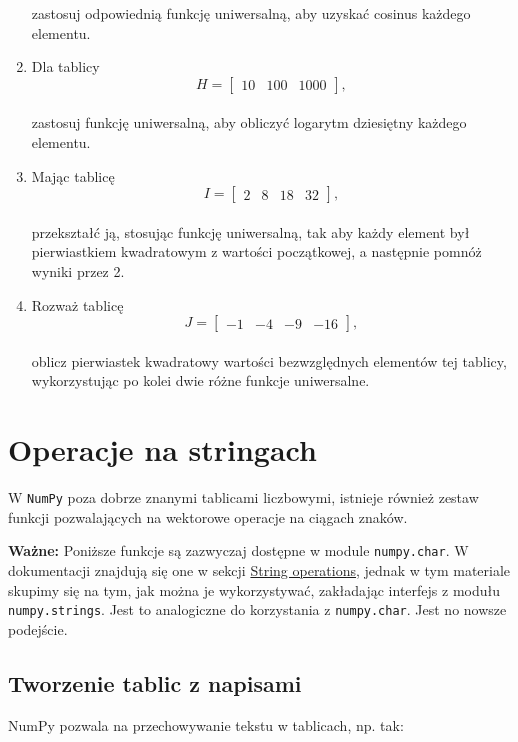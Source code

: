 \documentclass[
  letterpaper,
  DIV=11,
  numbers=noendperiod]{scrreprt}
\begin{document}
\begin{enumerate}
  zastosuj odpowiednią funkcję uniwersalną, aby uzyskać cosinus każdego
  elementu.
\item
  Dla tablicy\\
  \[H = \begin{bmatrix}10 & 100 & 1000\end{bmatrix},\]\\
  zastosuj funkcję uniwersalną, aby obliczyć logarytm dziesiętny każdego
  elementu.
\item
  Mając tablicę\\
  \[I = \begin{bmatrix}2 & 8 & 18 & 32\end{bmatrix},\]\\
  przekształć ją, stosując funkcję uniwersalną, tak aby każdy element
  był pierwiastkiem kwadratowym z wartości początkowej, a następnie
  pomnóż wyniki przez 2.
\item
  Rozważ tablicę\\
  \[J = \begin{bmatrix}-1 & -4 & -9 & -16\end{bmatrix},\]\\
  oblicz pierwiastek kwadratowy wartości bezwzględnych elementów tej
  tablicy, wykorzystując po kolei dwie różne funkcje uniwersalne.
\end{enumerate}

\chapter{Operacje na stringach}\label{operacje-na-stringach}

W \texttt{NumPy} poza dobrze znanymi tablicami liczbowymi, istnieje
również zestaw funkcji pozwalających na wektorowe operacje na ciągach
znaków.

\textbf{Ważne:} Poniższe funkcje są zazwyczaj dostępne w module
\texttt{numpy.char}. W dokumentacji znajdują się one w sekcji
\href{https://numpy.org/doc/stable/reference/routines.strings.html}{String
operations}, jednak w tym materiale skupimy się na tym, jak można je
wykorzystywać, zakładając interfejs z modułu \texttt{numpy.strings}.
Jest to analogiczne do korzystania z \texttt{numpy.char}. Jest no nowsze
podejście.

\section{Tworzenie tablic z napisami}\label{tworzenie-tablic-z-napisami}

NumPy pozwala na przechowywanie tekstu w tablicach, np. tak:
\end{document}
